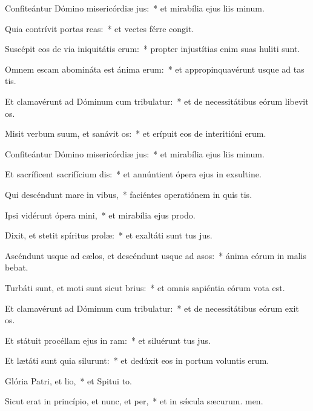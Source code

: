 \item Confiteántur Dómino misericórdiæ jus:~* et mirabília ejus liis minum.
\item Quia contrívit portas reas:~* et vectes férre congit.
\item Suscépit eos de via iniquitátis erum:~* propter injustítias enim suas huliti sunt.
\item Omnem escam abomináta est ánima erum:~* et appropinquavérunt usque ad tas tis.
\item Et clamavérunt ad Dóminum cum tribulatur:~* et de necessitátibus eórum libevit os.
\item Misit verbum suum, et sanávit os:~* et erípuit eos de interitióni erum.
\item Confiteántur Dómino misericórdiæ jus:~* et mirabília ejus liis minum.
\item Et sacríficent sacrifícium dis:~* et annúntient ópera ejus in exsultine.
\item Qui descéndunt mare in vibus,~* faciéntes operatiónem in quis tis.
\item Ipsi vidérunt ópera mini,~* et mirabília ejus  prodo.
\item Dixit, et stetit spíritus prolæ:~* et exaltáti sunt tus jus.
\item Ascéndunt usque ad cælos, et descéndunt usque ad asos:~* ánima eórum in malis bebat.
\item Turbáti sunt, et moti sunt sicut brius:~* et omnis sapiéntia eórum vota est.
\item Et clamavérunt ad Dóminum cum tribulatur:~* et de necessitátibus eórum exit os.
\item Et státuit procéllam ejus in ram:~* et siluérunt tus jus.
\item Et lætáti sunt quia silurunt:~* et dedúxit eos in portum voluntis erum.
\item Glória Patri, et lio,~* et Spitui to.
\item Sicut erat in princípio, et nunc, et per,~* et in sǽcula sæcurum. men.
